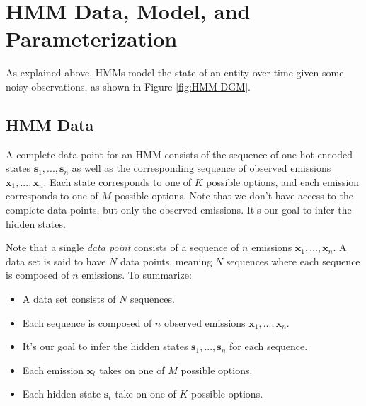 \section{HMM Data, Model, and Parameterization}
As explained above, HMMs model the state of an entity over time given some noisy observations, as shown in Figure \ref{fig:HMM-DGM}.

\subsection{HMM Data}
A complete data point for an HMM consists of the sequence of one-hot encoded states $\textbf{s}_1, ..., \textbf{s}_n$ as well as the corresponding sequence of observed emissions $\textbf{x}_1, ..., \textbf{x}_n$. Each state corresponds to one of $K$ possible options, and each emission corresponds to one of $M$ possible options. Note that we don't have access to the complete data points, but only the observed emissions. It's our goal to infer the hidden states.

Note that a single \textit{data point} consists of a sequence of $n$ emissions $\textbf{x}_1, ..., \textbf{x}_n$. A data set is said to have $N$ data points, meaning $N$ sequences where each sequence is composed of $n$ emissions. To summarize:
\begin{itemize}
	\item A data set consists of $N$ sequences.
	\item Each sequence is composed of $n$ observed emissions $\textbf{x}_1, ..., \textbf{x}_n$.
	\item It's our goal to infer the hidden states $\textbf{s}_1, ..., \textbf{s}_n$ for each sequence.
	\item Each emission $\textbf{x}_{t}$ takes on one of $M$ possible options.
	\item Each hidden state $\textbf{s}_{t}$ take on one of $K$ possible options.
\end{itemize}

